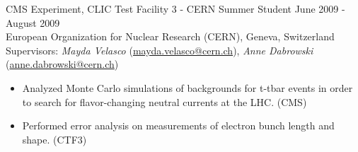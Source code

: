 CMS Experiment, CLIC Test Facility 3 - CERN Summer Student \hfill June 2009 - August 2009\\
European Organization for Nuclear Research (CERN), Geneva, Switzerland\\
Supervisors: {\sl Mayda Velasco} (\href{mailto:mayda.velasco@cern.ch}{mayda.velasco@cern.ch}), {\sl Anne Dabrowski} (\href{mailto:anne.dabrowski@cern.ch}{anne.dabrowski@cern.ch})
\begin{itemize}[leftmargin=12pt]
\item Analyzed Monte Carlo simulations of backgrounds for t-tbar events in order to search for flavor-changing neutral currents at the LHC. (CMS)
\item Performed error analysis on measurements of electron bunch length and shape. (CTF3)
\end{itemize}